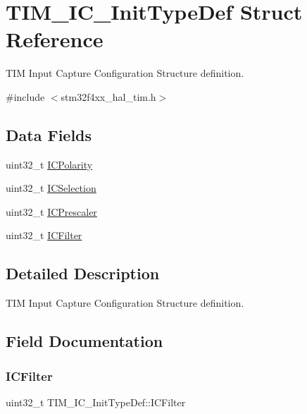 \hypertarget{struct_t_i_m___i_c___init_type_def}{}\section{T\+I\+M\+\_\+\+I\+C\+\_\+\+Init\+Type\+Def Struct Reference}
\label{struct_t_i_m___i_c___init_type_def}


T\+IM Input Capture Configuration Structure definition.  




{\ttfamily \#include $<$stm32f4xx\+\_\+hal\+\_\+tim.\+h$>$}

\subsection*{Data Fields}
\begin{DoxyCompactItemize}
\item 
uint32\+\_\+t \hyperlink{struct_t_i_m___i_c___init_type_def_ab122383ebc0926c49a814546471da9b3}{I\+C\+Polarity}
\item 
uint32\+\_\+t \hyperlink{struct_t_i_m___i_c___init_type_def_aad80556490de79727ba1269c851e9724}{I\+C\+Selection}
\item 
uint32\+\_\+t \hyperlink{struct_t_i_m___i_c___init_type_def_a452a4a459b6f7b7c478db032de9b0d72}{I\+C\+Prescaler}
\item 
uint32\+\_\+t \hyperlink{struct_t_i_m___i_c___init_type_def_ae8432aa11b5495b252ac7ae299eabb32}{I\+C\+Filter}
\end{DoxyCompactItemize}


\subsection{Detailed Description}
T\+IM Input Capture Configuration Structure definition. 

\subsection{Field Documentation}
\mbox{\label{struct_t_i_m___i_c___init_type_def_ae8432aa11b5495b252ac7ae299eabb32}} 
\subsubsection{\texorpdfstring{I\+C\+Filter}{ICFilter}}
{\footnotesize\ttfamily uint32\+\_\+t T\+I\+M\+\_\+\+I\+C\+\_\+\+Init\+Type\+Def\+::\+I\+C\+Filter}

